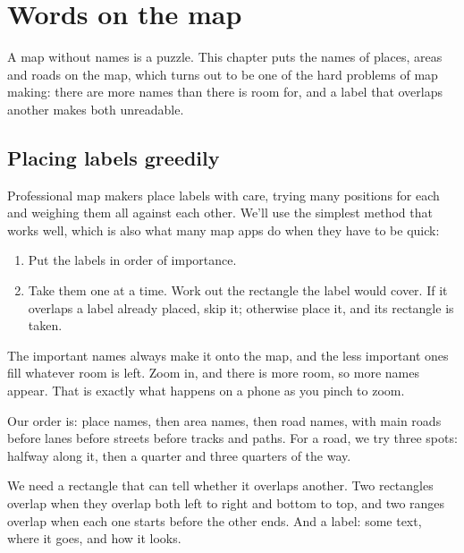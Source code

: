 \chapter{Words on the map}\label{ch:labels}

A map without names is a puzzle. This chapter puts the names of places,
areas and roads on the map, which turns out to be one of the hard problems
of map making: there are more names than there is room for, and a label
that overlaps another makes both unreadable.

\section{Placing labels greedily}

Professional map makers place labels with care, trying many positions for
each and weighing them all against each other. We'll use the simplest
method that works well, which is also what many map apps do when they have
to be quick:

\begin{enumerate}[nosep]
  \item Put the labels in order of importance.
  \item Take them one at a time. Work out the rectangle the label would
    cover. If it overlaps a label already placed, skip it; otherwise place
    it, and its rectangle is taken.
\end{enumerate}

The important names always make it onto the map, and the less important
ones fill whatever room is left. Zoom in, and there is more room, so more
names appear. That is exactly what happens on a phone as you pinch to
zoom.

Our order is: place names, then area names, then road names, with main
roads before lanes before streets before tracks and paths. For a road, we
try three spots: halfway along it, then a quarter and three quarters of
the way.

We need a rectangle that can tell whether it overlaps another. Two
rectangles overlap when they overlap both left to right and bottom to
top, and two ranges overlap when each one starts before the other ends.
And a label: some text, where it goes, and how it looks.


